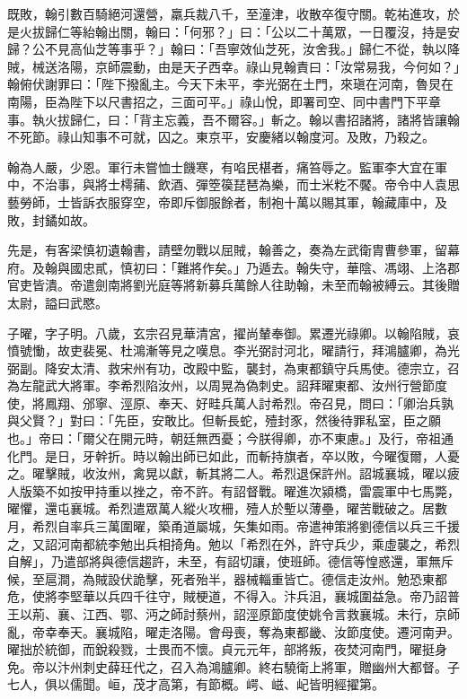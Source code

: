 \begin{pinyinscope}
 既敗，翰引數百騎絕河還營，羸兵裁八千，至潼津，收散卒復守關。乾祐進攻，於是火拔歸仁等紿翰出關，翰曰：「何邪？」曰：「公以二十萬眾，一日覆沒，持是安歸？公不見高仙芝等事乎？」翰曰：「吾寧效仙芝死，汝舍我。」歸仁不從，執以降賊，械送洛陽，京師震動，由是天子西幸。祿山見翰責曰：「汝常易我，今何如？」翰俯伏謝罪曰：「陛下撥亂主。今天下未平，李光弼在土門，來瑱在河南，魯炅在南陽，臣為陛下以尺書招之，三面可平。」祿山悅，即署司空、同中書門下平章事。執火拔歸仁，曰：「背主忘義，吾不爾容。」斬之。翰以書招諸將，諸將皆讓翰不死節。祿山知事不可就，囚之。東京平，安慶緒以翰度河。及敗，乃殺之。



 翰為人嚴，少恩。軍行未嘗恤士饑寒，有啗民椹者，痛笞辱之。監軍李大宜在軍中，不治事，與將士樗蒱、飲酒、彈箜篌琵琶為樂，而士米籺不饜。帝令中人袁思藝勞師，士皆訴衣服穿空，帝即斥御服餘者，制袍十萬以賜其軍，翰藏庫中，及敗，封鐍如故。



 先是，有客梁慎初遺翰書，請壁勿戰以屈賊，翰善之，奏為左武衛胄曹參軍，留幕府。及翰與國忠貳，慎初曰：「難將作矣。」乃遁去。翰失守，華陰、馮翊、上洛郡官吏皆潰。帝遣劍南將劉光庭等將新募兵萬餘人往助翰，未至而翰被縛云。其後贈太尉，謚曰武愍。



 子曜，字子明。八歲，玄宗召見華清宮，擢尚輦奉御。累遷光祿卿。以翰陷賊，哀憤號慟，故吏裴冕、杜鴻漸等見之嘆息。李光弼討河北，曜請行，拜鴻臚卿，為光弼副。降安太清、救宋州有功，改殿中監，襲封，為東都鎮守兵馬使。德宗立，召為左龍武大將軍。李希烈陷汝州，以周晃為偽刺史。詔拜曜東都、汝州行營節度使，將鳳翔、邠寧、涇原、奉天、好畦兵萬人討希烈。帝召見，問曰：「卿治兵孰與父賢？」對曰：「先臣，安敢比。但斬長蛇，殪封豕，然後待罪私室，臣之願也。」帝曰：「爾父在開元時，朝廷無西憂；今朕得卿，亦不東慮。」及行，帝祖通化門。是日，牙幹折。時以翰出師已如此，而斬持旗者，卒以敗，今曜復爾，人憂之。曜擊賊，收汝州，禽晃以獻，斬其將二人。希烈退保許州。詔城襄城，曜以疲人版築不如按甲持重以挫之，帝不許。有詔督戰。曜進次潁橋，雷震軍中七馬斃，曜懼，還屯襄城。希烈遣眾萬人縱火攻柵，殪人於塹以薄壘，曜苦戰破之。居數月，希烈自率兵三萬圍曜，築甬道屬城，矢集如雨。帝遣神策將劉德信以兵三千援之，又詔河南都統李勉出兵相掎角。勉以「希烈在外，許守兵少，乘虛襲之，希烈自解」，乃遣部將與德信趨許，未至，有詔切讓，使班師。德信等惶惑還，軍無斥候，至扈澗，為賊設伏詭擊，死者殆半，器械輜重皆亡。德信走汝州。勉恐東都危，使將李堅華以兵四千往守，賊梗道，不得入。汴兵沮，襄城圍益急。帝乃詔普王以荊、襄、江西、鄂、沔之師討蔡州，詔涇原節度使姚令言救襄城。未行，京師亂，帝幸奉天。襄城陷，曜走洛陽。會母喪，奪為東都畿、汝節度使。遷河南尹。曜拙於統御，而銳殺戮，士畏而不懷。貞元元年，部將叛，夜焚河南門，曜挺身免。帝以汴州刺史薛玨代之，召入為鴻臚卿。終右驍衛上將軍，贈幽州大都督。子七人，俱以儒聞。峘，茂才高第，有節概。崿、嵫、屺皆明經擢第。




\end{pinyinscope}
